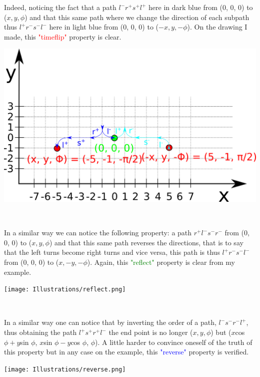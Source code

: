 \documentclass[11pt,a4paper]{article}
\begin{document}
	\begin{minipage}{0.8\textwidth}
	\raggedright
	Indeed, noticing the fact that a path $l^-r^+s^+l^+$ here in dark blue from (0, 0, 0) to ($x, y, \phi$) and that this same path where we change the direction of each subpath thus $l^+r^-s^-l^-$ here in light blue from (0, 0, 0) to ($-x,y,-\phi$). On the drawing I made, this \textcolor{red}{"timeflip"} property is clear.
	\end{minipage}
	\begin{minipage}{0.2\textwidth}
	\raggedright
	\includegraphics[width=\linewidth]{Illustrations/timeflip.png}
	\end{minipage}\\
	
	\begin{minipage}{0.8\textwidth}
	\raggedright
	In a similar way we can notice the following property: a path $r^+l^-s^-r^-$ from (0, 0, 0) to ($x, y, \phi$) and that this same path reverses the directions, that is to say that the left turns become right turns and vice versa, this path is thus $l^+r^-s^-l^-$ from (0, 0, 0) to ($x,-y,-\phi$). Again, this \textcolor{green}{"reflect"} property is clear from my example.
	\end{minipage}
	\begin{minipage}{0.2\textwidth}
	\texttt{[image: Illustrations/reflect.png]}
	\end{minipage}\\
	
	\begin{minipage}{0.8\textwidth}
	\raggedright
	In a similar way one can notice that by inverting the order of a path, $l^-s^-r^-l^+$, thus obtaining the path $l^+s^+r^+l^-$ the end point is no longer ($x, y, \phi$) but ($x$cos $\phi+y$sin $\phi$, $x$sin $\phi-y$cos $\phi$, $\phi$). A little harder to convince oneself of the truth of this property but in any case on the example, this \textcolor{blue}{"reverse"} property is verified.
	\end{minipage}
	\begin{minipage}{0.2\textwidth}
	\texttt{[image: Illustrations/reverse.png]}
	\end{minipage}\\
	
\end{document}

